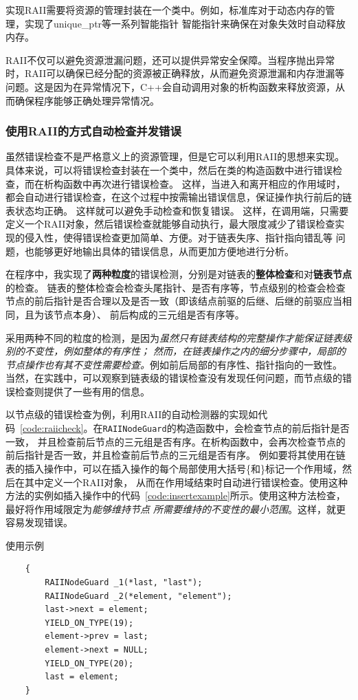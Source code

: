 \documentclass[a4paper,twoside]{article}
\begin{document}
\begin{spacing}{1.2}
实现RAII需要将资源的管理封装在一个类中。例如，标准库对于动态内存的管理，实现了unique\_ptr等一系列智能指针
智能指针来确保在对象失效时自动释放内存。

RAII不仅可以避免资源泄漏问题，还可以提供异常安全保障。当程序抛出异常时，RAII可以确保已经分配的资源被正确释放，从而避免资源泄漏和内存泄漏等问题。这是因为在异常情况下，C++会自动调用对象的析构函数来释放资源，从而确保程序能够正确处理异常情况。

\subsubsection{使用RAII的方式自动检查并发错误}

虽然错误检查不是严格意义上的资源管理，但是它可以利用RAII的思想来实现。具体来说，可以将错误检查封装在一个类中，然后在类的构造函数中进行错误检查，而在析构函数中再次进行错误检查。
这样，当进入和离开相应的作用域时，都会自动进行错误检查，在这个过程中按需输出错误信息，保证操作执行前后的链表状态均正确。
这样就可以避免手动检查和恢复错误。
这样，在调用端，只需要定义一个RAII对象，然后错误检查就能够自动执行，最大限度减少了错误检查实现的侵入性，使得错误检查更加简单、方便。对于链表失序、指针指向错乱等
问题，也能够更好地输出具体的错误信息，从而更加方便地进行分析。

在程序中，我实现了\textbf{两种粒度}的错误检测，分别是对链表的\textbf{整体检查}和对\textbf{链表节点}的检查。
链表的整体检查会检查头尾指针、是否有序等，节点级别的检查会检查节点的前后指针是否合理以及是否一致（即该结点前驱的后继、后继的前驱应当相同，且为该节点本身）、
前后构成的三元组是否有序等。

采用两种不同的粒度的检测，是因为\emph{虽然只有链表结构的完整操作才能保证链表级别的不变性，例如整体的有序性；
然而，在链表操作之内的细分步骤中，局部的节点操作也有其不变性需要检查。}例如前后局部的有序性、指针指向的一致性。
当然，在实践中，可以观察到链表级的错误检查没有发现任何问题，而节点级的错误检查则提供了一些有用的信息。

以节点级的错误检查为例，利用RAII的自动检测器的实现如代码~\ref{code:raiicheck}。在\texttt{RAIINodeGuard}的构造函数中，会检查节点的前后指针是否一致，
并且检查前后节点的三元组是否有序。在析构函数中，会再次检查节点的前后指针是否一致，并且检查前后节点的三元组是否有序。
例如要将其使用在链表的插入操作中，可以在插入操作的每个局部使用大括号\{和\}标记一个作用域，然后在其中定义一个RAII对象，
从而在作用域结束时自动进行错误检查。使用这种方法的实例如插入操作中的代码~\ref{code:insertexample}所示。使用这种方法检查，最好将作用域限定为\emph{能够维持节点
所需要维持的不变性的最小范围}。这样，就更容易发现错误。
\begin{listing}[H]
	\caption{使用示例}
	\label{code:insertexample}
	\begin{verbatim}
	{
		RAIINodeGuard _1(*last, "last");
		RAIINodeGuard _2(*element, "element");
		last->next = element;
		YIELD_ON_TYPE(19);
		element->prev = last;
		element->next = NULL;
		YIELD_ON_TYPE(20);
		last = element;
	}
	\end{verbatim}
\end{listing}


\end{spacing}
\end{document}
